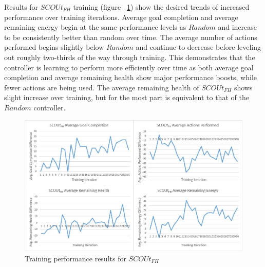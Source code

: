 Results for $SCOUt_{FH}$ training (figure ~\ref{fig:findhuman_training_results}) show the desired trends of increased performance over training iterations.
Average goal completion and average remaining energy begin at the same performance levels as $Random$ and increase to be consistently better than random over time.
The average number of actions performed begins slightly below $Random$ and continue to decrease before leveling out roughly two-thirds of the way through training.
This demonstrates that the controller is learning to perform more efficiently over time as both average goal completion and average remaining health show major performance boosts, while fewer actions are being used.
The average remaining health of $SCOUt_{FH}$ shows slight increase over training, but for the most part is equivalent to that of the $Random$ controller.

\begin{figure}[h]
  \includegraphics[width=1.0\columnwidth]{Figures/Results/Training/SCOUt-FindHuman.JPG}
  \caption{Training performance results for $SCOUt_{FH}$}
  \label{fig:findhuman_training_results}
\end{figure}

